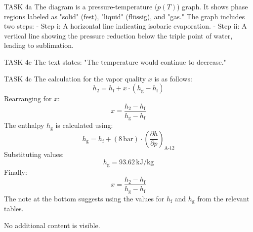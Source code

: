 TASK 4a  
The diagram is a pressure-temperature (\( p(T) \)) graph. It shows phase regions labeled as "solid" (\( \text{fest} \)), "liquid" (\( \text{flüssig} \)), and "gas." The graph includes two steps:  
- Step i: A horizontal line indicating isobaric evaporation.  
- Step ii: A vertical line showing the pressure reduction below the triple point of water, leading to sublimation.  

TASK 4e  
The text states:  
"The temperature would continue to decrease."  

TASK 4c  
The calculation for the vapor quality \( x \) is as follows:  
\[
h_2 = h_{\text{f}} + x \cdot (h_{\text{g}} - h_{\text{f}})
\]  
Rearranging for \( x \):  
\[
x = \frac{h_2 - h_{\text{f}}}{h_{\text{g}} - h_{\text{f}}}
\]  
The enthalpy \( h_{\text{g}} \) is calculated using:  
\[
h_{\text{g}} = h_{\text{f}} + (8 \, \text{bar}) \cdot \left( \frac{\partial h}{\partial p} \right)_{\text{A-12}}
\]  
Substituting values:  
\[
h_{\text{g}} = 93.62 \, \text{kJ/kg}
\]  
Finally:  
\[
x = \frac{h_2 - h_{\text{f}}}{h_{\text{g}} - h_{\text{f}}}
\]  
The note at the bottom suggests using the values for \( h_{\text{f}} \) and \( h_{\text{g}} \) from the relevant tables.  

No additional content is visible.